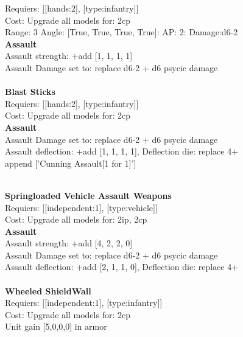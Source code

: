 Requiers: [[hands:2], [type:infantry]] \\
Cost: Upgrade all models for: 2cp \\


Range: 3  Angle: [True, True, True, True]: AP: 2: Damage:d6-2 \\



{\bf Assault} \ \\
Assault strength: +add [1, 1, 1, 1] 
\\ 
Assault Damage set to: replace d6-2 + d6 psycic damage
\\ 




\ \\
{\bf Blast Sticks } \\

Requiers: [[hands:2], [type:infantry]] \\
Cost: Upgrade all models for: 2cp \\




{\bf Assault} \ \\
Assault Damage set to: replace d6-2 + d6 psycic damage
\\ 
Assault deflection: +add [1, 1, 1, 1], Deflection die: replace 4+
\\ 

append ['Cunning Assault[1 for 1]']


\ \\
{\bf Springloaded Vehicle Assault Weapons } \\

Requiers: [[independent:1], [type:vehicle]] \\
Cost: Upgrade all models for: 2ip, 2cp \\




{\bf Assault} \ \\
Assault strength: +add [4, 2, 2, 0] 
\\ 
Assault Damage set to: replace d6-2 + d6 psycic damage
\\ 
Assault deflection: +add [2, 1, 1, 0], Deflection die: replace 4+
\\ 




\ \\
{\bf Wheeled ShieldWall } \\

Requiers: [[independent:1], [type:infantry]] \\
Cost: Upgrade all models for: 2cp \\
Unit gain [5,0,0,0] in armor\\ 




